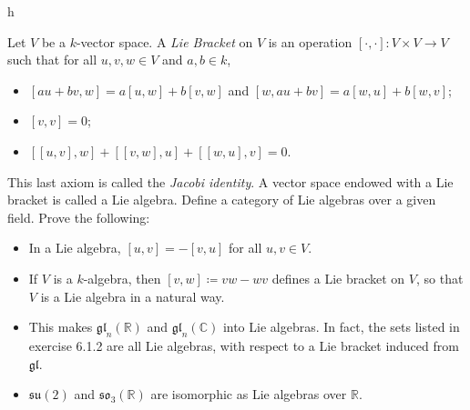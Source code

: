 \documentclass[11pt]{report}
\begin{document}
\begin{solution}
	h
\end{solution}
\begin{exercise}
	Let $V$ be a $k$-vector space. A \emph{Lie Bracket} on $V$ is an operation $\left[ \cdot ,\cdot  \right] : V\times V \to V$ such that for all $u,v,w\in V $ and $a,b\in k$,
	\begin{itemize}
		\item $[au+bv,w]=a[u,w]+b[v,w]$ and $[w,au+bv]=a[w,u]+b[w,v]$;
		\item $[v,v]=0$;
		\item $[[u,v],w]+[[v,w],u]+[[w,u],v]=0$.
	\end{itemize}
	This last axiom is called the \emph{Jacobi identity}. A vector space endowed with a Lie bracket is called a Lie algebra. Define a category of Lie algebras over a given field. Prove the following:
	\begin{itemize}
		\item In a Lie algebra, $[u,v]=-[v,u]$ for all $u,v\in V$.
		\item If $V$ is a $k$-algebra, then $[v,w]\coloneqq vw-wv$ defines a Lie bracket on $V$, so that $V$ is a Lie algebra in a natural way.
		\item This makes $\mathfrak{gl}_n(\mathbb{R} )$ and $\mathfrak{gl}_n(\mathbb{C} )$ into Lie algebras. In fact, the sets listed in exercise 6.1.2 are all Lie algebras, with respect to a Lie bracket induced from $\mathfrak{gl}$.
		\item $\mathfrak{su} (2)$ and $\mathfrak{so}_3(\mathbb{R} )$ are isomorphic as Lie algebras over $\mathbb{R} $.
	\end{itemize}
\end{exercise}
\end{document}
